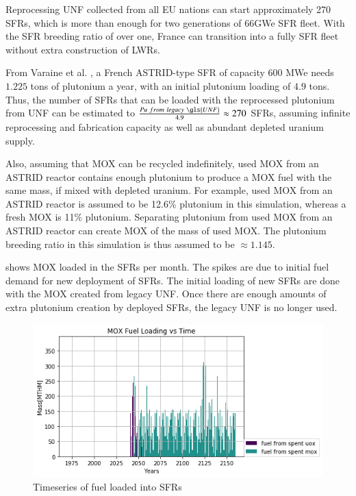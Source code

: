 	Reprocessing \gls{UNF} collected from all EU nations can start approximately
	270 \glspl{SFR}, which is more than enough for two generations of 66GWe \gls{SFR}
	fleet. With the \gls{SFR} breeding ratio of over one, France can transition into
	a fully \gls{SFR} fleet without extra construction of \glspl{LWR}. 
	
	From Varaine et al. \cite{marsaultmarie-sophie_pre-conceptual_2012}, a French
	ASTRID-type \gls{SFR} of capacity 600 MWe needs $1.225$ tons of
	plutonium a year, with an initial plutonium loading of $4.9$ tons. 
	Thus, the number of \glspl{SFR} that can be loaded with the reprocessed
	plutonium from \gls{UNF} can be estimated to $\frac{Pu \ from \ legacy \ \gls{UNF}}{4.9} \approx 270$ \glspl{SFR},
	assuming infinite reprocessing and fabrication capacity as well as
	abundant depleted uranium supply. 
	
	Also, assuming that \gls{MOX} can be recycled indefinitely,
	used \gls{MOX} from an ASTRID reactor contains enough plutonium to produce a \gls{MOX} fuel with
	the same mass, if mixed with depleted uranium. For example,
	used \gls{MOX} from an ASTRID reactor is assumed to be 12.6\% plutonium
	in this simulation, whereas a fresh \gls{MOX} is 11\% plutonium.
	Separating plutonium from used \gls{MOX} from
	an ASTRID reactor can create \gls{MOX} of the mass of used \gls{MOX}.
	The plutonium breeding ratio in this simulation is thus assumed to be
	$\approx 1.145$.
	
	 shows \gls{MOX} loaded in the \glspl{SFR} per month.
	The spikes are due to initial fuel demand for new deployment of \glspl{SFR}.
	The initial loading of new \glspl{SFR} are done with the \gls{MOX} created
	from legacy \gls{UNF}. Once there are enough amounts of extra plutonium creation
	by deployed \glspl{SFR}, the legacy \gls{UNF} is no longer used. 
	
	\begin{figure}[htbp!]
		\begin{center}
			\includegraphics[width=\columnwidth]{./images/french-transition/where_fuel.png}
		\end{center}
		\caption{Timeseries of fuel loaded into \glspl{SFR}}
		\label{fig:fuel}
	\end{figure}
	
